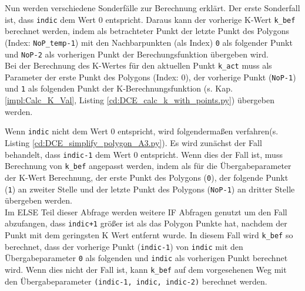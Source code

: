 {	Nun werden verschiedene Sonderfälle zur Berechnung erklärt. Der erste Sonderfall ist, dass \lstinline|indic| dem Wert 0 entspricht. Daraus kann der vorherige K-Wert \lstinline|k_bef| berechnet werden, indem als betrachteter Punkt der letzte Punkt des Polygons (Index: \lstinline|NoP_temp-1|) mit den Nachbarpunkten (als Index) \lstinline|0|  als folgender Punkt und \lstinline|NoP-2| als vorherigen Punkt der Berechungsfunktion übergeben wird. \\
	Bei der Berechnung des K-Wertes für den aktuellen Punkt \lstinline|k_act| muss als Parameter der erste Punkt des Polygons (Index: 0), der vorherige Punkt (\lstinline|NoP-1|) und \lstinline|1| als folgenden Punkt der K-Berechnungsfunktion (s. Kap. \ref{impl:Calc_K_Val}, Listing \ref{cd:DCE_calc_k_with_points.py}) übergeben werden. \\
	\ifimportant
	
	\fi
	Wenn \lstinline|indic| nicht dem Wert 0 entspricht, wird folgendermaßen verfahren\ifimportant (s. Listing \ref{cd:DCE_simplify_polygon_A3.py})\fi.
	Es wird zunächst der Fall behandelt, dass \lstinline|indic-1| dem Wert 0 entspricht. Wenn dies der Fall ist, muss Berechnung von \lstinline|k_bef| angepasst werden, indem als für die Übergabeparameter der K-Wert Berechnung, der erste Punkt des Polygons (\lstinline|0|), der folgende Punkt (\lstinline|1|) an zweiter Stelle und der letzte Punkt des Polygons (\lstinline|NoP-1|) an dritter Stelle übergeben werden. \\
	Im ELSE Teil dieser Abfrage werden weitere IF Abfragen genutzt um den Fall abzufangen, dass \lstinline|indic+1| größer ist als das Polygon Punkte hat, nachdem der Punkt mit dem geringsten K Wert entfernt wurde. In diesem Fall wird \lstinline|k_bef| so berechnet, dass der vorherige Punkt (\lstinline|indic-1|) von \lstinline|indic| mit den Übergabeparameter \lstinline|0| als folgenden und \lstinline|indic| als vorherigen Punkt berechnet wird. Wenn dies nicht der Fall ist, kann \lstinline|k_bef| auf dem vorgesehenen Weg mit den Übergabeparameter \lstinline|(indic-1, indic, indic-2)| berechnet werden. \\

}

